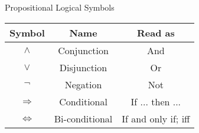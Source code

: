 \begin{defn}\label{mod1:defn:LogicSymbols}
	Propositional Logical Symbols
		
	\begin{table}[ht]
		\centering
		\begin{tabular}{|c|c|c|}
			\hline
				Symbol & Name & Read as\\
			\hline
			$\land$ & Conjunction & And \\
			$\lor$ &	Disjunction & Or \\
			$\lnot$ & Negation & Not\\
			$\Rightarrow$ & Conditional & If ... then ...\\
			$\Leftrightarrow$ & Bi-conditional & If and only if; iff\\
			\hline
		\end{tabular}
		\label{mod1:tab:LogicSymbols}
	\end{table}

\end{defn}		
\newpage
